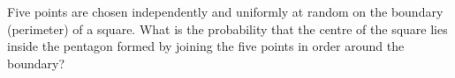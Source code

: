 Five points are chosen independently and uniformly at random on the boundary (perimeter) of a square. What is the probability that the centre of the square lies inside the pentagon formed by joining the five points in order around the boundary?
